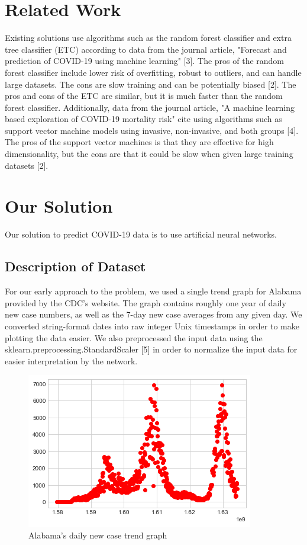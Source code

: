 \documentclass[conference]{IEEEtran}
\begin{document}
\section{Related Work}
Existing solutions use algorithms such as the random forest classifier and extra tree classifier (ETC) according to data from the journal article, "Forecast and prediction of COVID-19 using machine learning" [3]. The pros of the random forest classifier include lower risk of overfitting, robust to outliers, and can handle large datasets. The cons are slow training and can be potentially biased [2]. The pros and cons of the ETC are similar, but it is much faster than the random forest classifier. Additionally, data from the journal article, "A machine learning based exploration of COVID-19 mortality risk" cite using algorithms such as support vector machine models using invasive, non-invasive, and both groups [4]. The pros of the support vector machines is that they are effective for high dimensionality, but the cons are that it could be slow when given large training datasets [2].

\section{Our Solution}
Our solution to predict COVID-19 data is to use artificial neural networks.

\subsection{Description of Dataset}
For our early approach to the problem, we used a single trend graph for Alabama provided by the CDC's website. The graph contains roughly one year of daily new case numbers, as well as the 7-day new case averages from any given day. We converted string-format dates into raw integer Unix timestamps in order to make plotting the data easier. We also preprocessed the input data using the sklearn.preprocessing.StandardScaler [5] in order to normalize the input data for easier interpretation by the network.

\begin{figure}
    \centering
    \includegraphics[scale=0.6]{resources/alabama_cases_dataset.png}
    \caption{Alabama's daily new case trend graph}
    \label{fig:input_dataset}
\end{figure}
\end{document}
